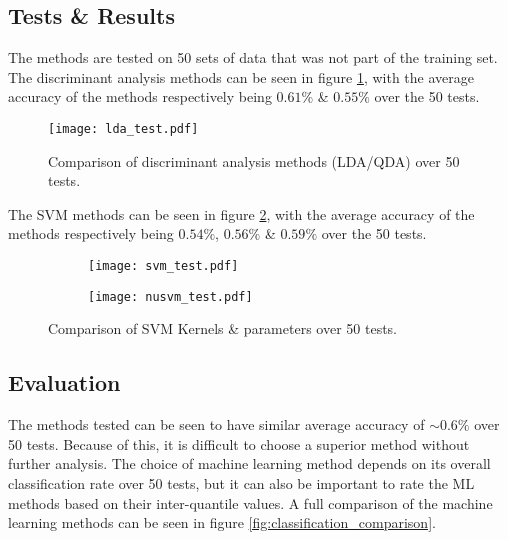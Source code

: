\documentclass[../main.tex]{subfiles}
\begin{document}
\subsection{Tests \& Results}

The methods are tested on 50 sets of data that was not part of the training set.
The discriminant analysis methods can be seen in figure \ref{fig:lda_test}, with the average accuracy of the methods respectively being $0.61\%$ \& $0.55\%$ over the 50 tests.

\begin{figure}[H]
\begin{center}
\texttt{[image: lda\_test.pdf]}
\caption{Comparison of discriminant analysis methods (\gls{LDA}/\gls{QDA}) over 50 tests.}
\label{fig:lda_test}
\end{center}
\end{figure}

The \gls{SVM} methods can be seen in figure \ref{fig:svm_test}, with the average accuracy of the methods respectively being $0.54\%$, $0.56\%$ \& $0.59\%$ over the 50 tests.

\begin{figure}[H]
    \centering
    \begin{subfigure}[b]{1\textwidth}
        \centering
\texttt{[image: svm\_test.pdf]}
    \end{subfigure}
    \centering
    \begin{subfigure}[b]{1\textwidth}
        \centering
\texttt{[image: nusvm\_test.pdf]}
    \end{subfigure}
    \caption{Comparison of \gls{SVM} Kernels \& parameters over 50 tests.}
\label{fig:svm_test}
\end{figure}

\subsection{Evaluation}

The methods tested can be seen to have similar average accuracy of $\sim 0.6\%$ over 50 tests.
Because of this, it is difficult to choose a superior method without further analysis.
The choice of machine learning method depends on its overall classification rate over 50 tests, but it can also be important to rate the ML methods based on their inter-quantile values.
A full comparison of the machine learning methods can be seen in figure \ref{fig:classification_comparison}.
\end{document}
